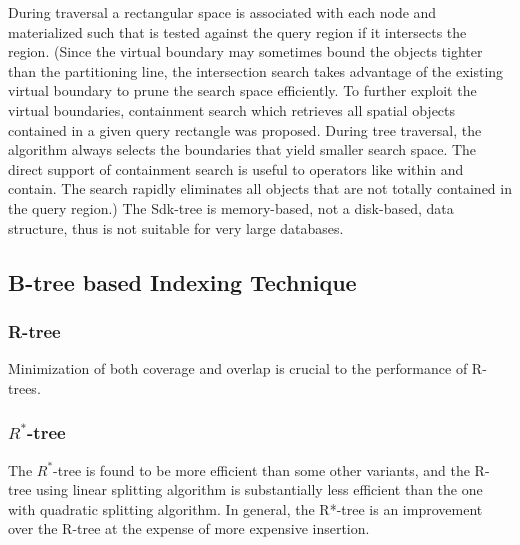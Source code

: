 \documentclass[a4paper,12pt]{article}
\begin{document}
During traversal a rectangular space is associated with each node and materialized  such that is tested against the query region if it intersects the region. 
(Since the virtual boundary may sometimes bound the objects tighter than the partitioning line, the intersection search takes advantage of the existing virtual boundary to prune the search space efficiently. To further exploit the virtual boundaries, containment search which retrieves all spatial objects contained in a given query rectangle was proposed. During tree traversal, the algorithm always selects the boundaries that yield smaller search space. The direct support of containment search is useful to operators like within and contain. The search rapidly eliminates all objects that are not totally contained in the query region.)
The Sdk-tree is memory-based, not a disk-based, data structure, thus is not suitable for very large databases.

\subsection{B-tree based Indexing Technique}
\subsubsection{R-tree}

Minimization of both coverage and overlap is crucial to the performance of R-trees.
\subsubsection{$R^*$-tree}
The $R^*$-tree is found to be more efficient than some other variants, and the R-tree using linear splitting algorithm is substantially less efficient than the one with quadratic splitting algorithm. In general, the R*-tree is an improvement over the R-tree at the expense of more expensive insertion.
\end{document}
